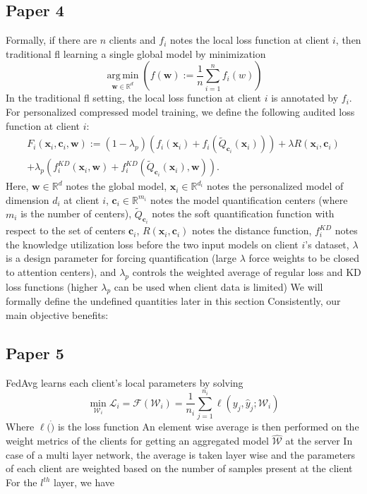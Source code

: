 \subsection{Paper 4}
Formally, if there are $n$ clients and $f_i$ notes the local loss function at client $i$, then traditional \acs{fl} learning a single global model by minimization
\begin{equation*}
    \operatorname*{\arg\,\min}_{\boldsymbol{w}\in{\mathbb{R}^d}}\left(f(\boldsymbol{w}):=\frac1n\sum_{i=1}^n f_i(w)\right)
\end{equation*}
In the traditional \acs{fl} setting, the local loss function at client $i$ is annotated by $f_i$. For personalized compressed model training, we define the following audited loss function at client $i$:
\begin{equation*}
    \begin{split}
    F_i(\mathbf{x}_i,\mathbf{c}_i,\mathbf{w}):=(1-\lambda_p)\left(f_i(\mathbf{x}_i)+f_i(\widetilde{Q}_{\mathbf{c}_i}(\mathbf{x}_i))\right)+\lambda R(\mathbf{x}_i,\mathbf{c}_i)\\
    +\lambda_p\left(f_i^{KD}(\mathbf{x}_i,\mathbf{w})+f_i^{KD}(\widetilde{Q}_{\mathbf{c}_i}(\mathbf{x}_i),\mathbf{w})\right).
    \end{split}
\end{equation*}
Here, $\mathbf{w}\in\mathbb{R}^d$ notes the global model, $\mathbf{x}_i\in\mathbb{R}^{d_i}$ notes the personalized model of dimension $d_i$ at client $i$, $\mathbf{c}_i\in\mathbb{R}^{m_i}$ notes the model quantification centers (where $m_i$ is the number of centers), $\widetilde{Q}_{\mathbf{c}_i}$ notes the soft quantification function with respect to the set of centers $\mathbf{c}_i$, $R(\mathbf{x}_i, \mathbf{c}_i)$ notes the distance function, $f_i^{KD}$ notes the knowledge utilization loss before the two input models on client $i$'s dataset, $\lambda$ is a design parameter for forcing quantification (large $\lambda$ force weights to be closed to attention centers), and $\lambda_p$ controls the weighted average of regular loss and KD loss functions (higher $\lambda_p$ can be used when client data is limited) We will formally define the undefined quantities later in this section Consistently, our main objective benefits:
\subsection{Paper 5}
FedAvg learns each client's local parameters by solving
\begin{equation*}
    \min_{\mathcal{W}_i}\mathcal{L}_i=\mathcal{F}(\mathcal{W}_i)=\frac1{n_i}\sum_{j=1}^{n_i}\ell(y_j,\hat{y}_j;\mathcal{W}_i)
\end{equation*}
Where $\ell(\dot)$ is the loss function An element wise average is then performed on the weight metrics of the clients for getting an aggregated model $\hat{\mathcal{W}}$ at the server In case of a multi layer network, the average is taken layer wise and the parameters of each client are weighted based on the number of samples present at the client For the $l^{th}$ layer, we have
